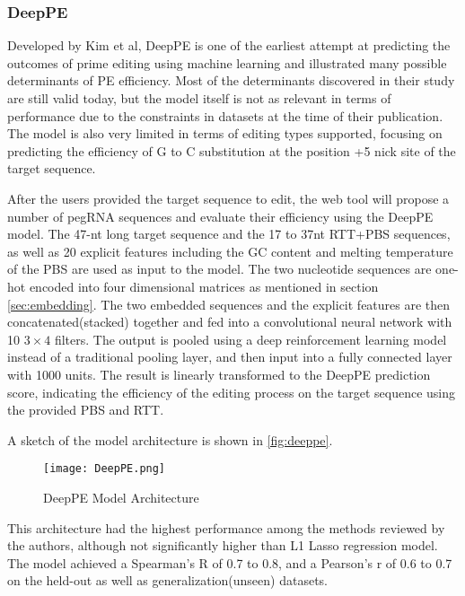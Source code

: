 \subsubsection{DeepPE}

Developed by Kim et al, DeepPE is one of the earliest attempt at predicting the outcomes of prime editing using machine learning and illustrated many possible determinants of PE efficiency. Most of the determinants discovered in their study are still valid today, but the model itself is not as relevant in terms of performance due to the constraints in datasets at the time of their publication. The model is also very limited in terms of editing types supported, focusing on predicting the efficiency of G to C substitution at the position +5 nick site of the target sequence. 

After the users provided the target sequence to edit, the web tool will propose a number of pegRNA sequences and evaluate their efficiency using the DeepPE model. The 47-nt long target sequence and the 17 to 37nt RTT+PBS sequences, as well as 20 explicit features including the GC content and melting temperature of the PBS are used as input to the model. The two nucleotide sequences are one-hot encoded into four dimensional matrices as mentioned in section \ref{sec:embedding}. The two embedded sequences and the explicit features are then concatenated(stacked) together and fed into a convolutional neural network with 10 $3 \times 4$ filters. The output is pooled using a deep reinforcement learning model instead of a traditional pooling layer, and then input into a fully connected layer with 1000 units. The result is linearly transformed to the DeepPE prediction score, indicating the efficiency of the editing process on the target sequence using the provided PBS and RTT.

A sketch of the model architecture is shown in \autoref{fig:deeppe}.

\begin{figure}[ht]
    \centering
    \texttt{[image: DeepPE.png]}
    \caption{DeepPE Model Architecture}
    \label{fig:deeppe}
\end{figure}

This architecture had the highest performance among the methods reviewed by the authors, although not significantly higher than L1 Lasso regression model. The model achieved a Spearman's R of 0.7 to 0.8, and a Pearson's r of 0.6 to 0.7 on the held-out as well as generalization(unseen) datasets.

